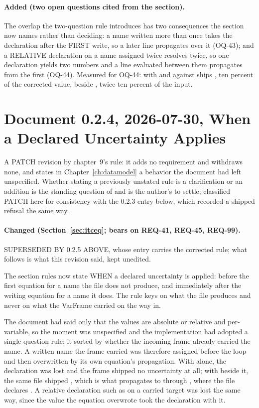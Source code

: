 \paragraph{Added (two open questions cited from the section).} The overlap
the two-question rule introduces has two consequences the section now names
rather than deciding: a name written more than once takes the declaration
after the FIRST write, so a later line propagates over it (OQ-43); and a
RELATIVE declaration on a name assigned twice resolves twice, so one
declaration yields two numbers and a line evaluated between them propagates
from the first (OQ-44). Measured for OQ-44:  with
 and  against 
ships , ten percent of the corrected value, beside
, twice ten percent of the input.

\section*{Document 0.2.4, 2026-07-30, When a Declared Uncertainty Applies}

A PATCH revision by chapter~9's rule: it adds no requirement and withdraws
none, and states in Chapter~\ref{ch:datamodel} a behavior the document had
left unspecified. Whether stating a previously unstated rule is a
clarification or an addition is the standing question of
 and is the author's to settle; classified PATCH
here for consistency with the 0.2.3 entry below, which recorded a shipped
refusal the same way.

\paragraph{Changed (Section~\ref{sec:itceq}; bears on REQ-41, REQ-45,
REQ-99).} SUPERSEDED BY 0.2.5 ABOVE, whose entry carries the corrected
rule; what follows is what this revision said, kept unedited.

The section rules now state WHEN a declared uncertainty is applied:
before the first equation for a name the file does not produce, and
immediately after the writing equation for a name it does. The rule keys
on what the file produces and never on what the VarFrame carried on the
way in.

The document had said only that the values are absolute or relative and
per-variable, so the moment was unspecified and the implementation had
adopted a single-question rule: it sorted by whether the incoming frame
already carried the name. A written name the frame carried was therefore
assigned before the loop and then overwritten by its own equation's
propagation. With  alone, the declaration was
lost and the frame shipped no uncertainty at all; with 
beside it, the same file shipped , which is what
 propagates to through , where the file
declares . A relative declaration such as  on a
carried target was lost the same way, since the value the equation
overwrote took the declaration with it.

